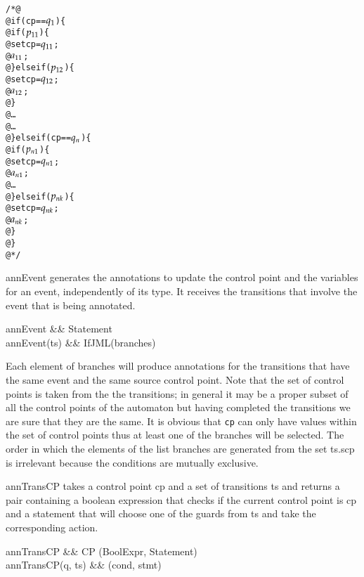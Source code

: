 \documentclass[a4paper,10pt]{article}
\begin{document}
\begin{alltt}
/*@
  @ if (cp == \(q\sb{1}\)) \{
  @   if (\(p\sb{11}\)) \{
  @     set cp = \(q\sb{11}\);
  @     \(a\sb{11}\);
  @   \} else if (\(p\sb{12}\)) \{
  @     set cp = \(q\sb{12}\);
  @     \(a\sb{12}\);
  @   \}
  @   \ldots
  @ \ldots
  @ \} else if (cp == \(q\sb{n}\)) \{
  @   if (\(p\sb{n1}\)) \{
  @     set cp = \(q\sb{n1}\);
  @     \(a\sb{n1}\);
  @   \ldots
  @   \} else if (\(p\sb{nk}\)) \{
  @     set cp = \(q\sb{nk}\);
  @     \(a\sb{nk}\);
  @   \}
  @ \}
  @*/
\end{alltt}

\<annEvent\> generates the annotations to update the control point and the variables for an event,
independently of its type. It receives the transitions that involve the event that is being annotated.

\begin{haskell}\label{def:annEventSimp}
annEvent &\ofType& \Delta \to Statement\\
annEvent(ts) &\eqdef& IfJML(branches)
\end{haskell}

Each element of \<branches\> will produce annotations for the transitions that have the same event and the
same source control point.
Note that the set of control points is taken from the the transitions; in general it may be a proper subset of
all the control points of the automaton but having completed the transitions we are sure that they are the
same. It is obvious that \texttt{cp} can only have values within the set of control points thus at least one
of the branches will be selected.
The order in which the elements of the list \<branches\> are generated from the set \<ts.scp\> is
irrelevant because the conditions are mutually exclusive.

\bigskip
\<annTransCP\> takes a control point \<cp\> and a set of transitions \<ts\> and returns a pair containing a
boolean expression that checks if the current control point is \<cp\> and a statement that will choose one of
the guards from \<ts\> and take the corresponding action.
\begin{haskell}\label{def:annTransCP}
annTransCP &\ofType& CP \to \Delta \to (BoolExpr, Statement)\\
annTransCP(q, ts) &\eqdef& (cond, stmt)
\end{haskell}
\end{document}
